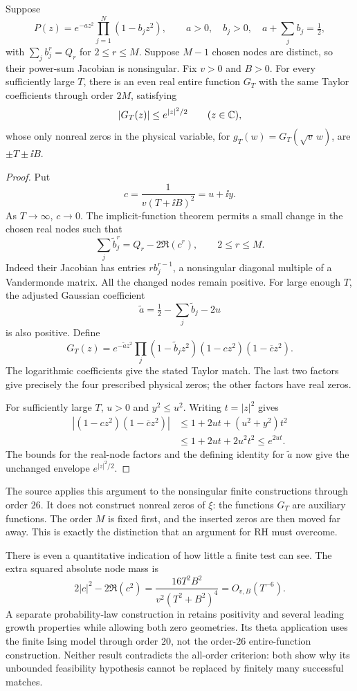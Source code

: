 \begin{proposition}\label{prop:finite-insertion}
Suppose
\[
 P(z)=e^{-az^2}\prod_{j=1}^N(1-b_jz^2),\qquad
 a>0,\quad b_j>0,\quad a+\sum_jb_j=\tfrac12,
\]
with $\sum_jb_j^r=Q_r$ for $2\le r\le M$. Suppose $M-1$ chosen nodes are distinct, so their power-sum Jacobian is nonsingular. Fix $v>0$ and $B>0$. For every sufficiently large $T$, there is an even real entire function $G_T$ with the same Taylor coefficients through order $2M$, satisfying
\[
 |G_T(z)|\le e^{|z|^2/2}\qquad(z\in\mathbb C),
\]
whose only nonreal zeros in the physical variable, for $g_T(w)=G_T(\sqrt v\,w)$, are $\pm T\pm\ii B$.
\end{proposition}
\begin{proof}
Put
\[
 c=\frac1{v(T+\ii B)^2}=u+\ii y.
\]
As $T\to\infty$, $c\to0$. The implicit-function theorem permits a small change in the chosen real nodes such that
\[
 \sum_j\widetilde b_j^r=Q_r-2\Re(c^r),\qquad 2\le r\le M.
\]
Indeed their Jacobian has entries $r b_j^{r-1}$, a nonsingular diagonal multiple of a Vandermonde matrix. All the changed nodes remain positive. For large enough $T$, the adjusted Gaussian coefficient
\[
 \widetilde a=\tfrac12-\sum_j\widetilde b_j-2u
\]
is also positive. Define
\[
 G_T(z)=e^{-\widetilde a z^2}
   \prod_j(1-\widetilde b_jz^2)(1-cz^2)(1-\overline c z^2).
\]
The logarithmic coefficients give the stated Taylor match. The last two factors give precisely the four prescribed physical zeros; the other factors have real zeros.

For sufficiently large $T$, $u>0$ and $y^2\le u^2$. Writing $t=|z|^2$ gives
\[
 \begin{split}
 |(1-cz^2)(1-\overline c z^2)|
 &\le 1+2ut+(u^2+y^2)t^2\\
 &\le 1+2ut+2u^2t^2\le e^{2ut}.
 \end{split}
\]
The bounds for the real-node factors and the defining identity for $\widetilde a$ now give the unchanged envelope $e^{|z|^2/2}$.
\end{proof}

The source applies this argument to the nonsingular finite constructions through order $26$. It does not construct nonreal zeros of $\xi$: the functions $G_T$ are auxiliary functions. The order $M$ is fixed first, and the inserted zeros are then moved far away. This is exactly the distinction that an argument for RH must overcome.

There is even a quantitative indication of how little a finite test can see. The extra squared absolute node mass is
\[
 2|c|^2-2\Re(c^2)
 =\frac{16T^2B^2}{v^2(T^2+B^2)^4}=O_{v,B}(T^{-6}).
\]
A separate probability-law construction in \cite{R1008} retains positivity and several leading growth properties while allowing both zero geometries. Its theta application uses the finite Ising model through order $20$, not the order-$26$ entire-function construction. Neither result contradicts the all-order criterion: both show why its unbounded feasibility hypothesis cannot be replaced by finitely many successful matches.
